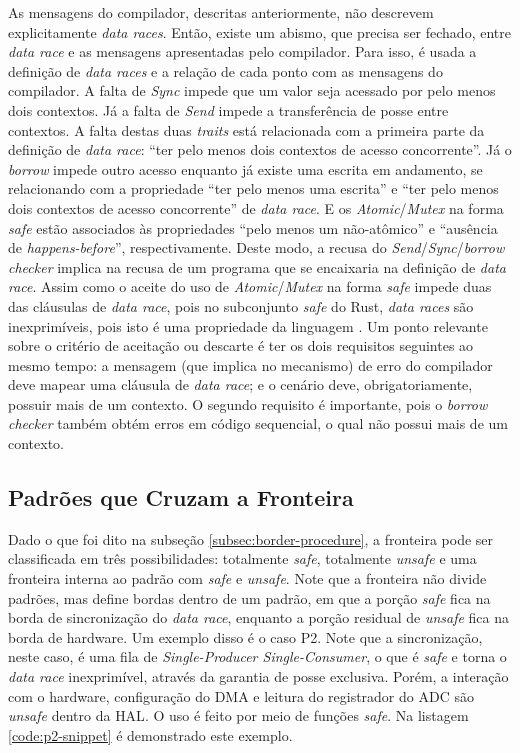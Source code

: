 As mensagens do compilador, descritas anteriormente, não descrevem explicitamente \textit{data races}. Então, existe um abismo, que precisa ser fechado, entre \textit{data race} e as mensagens apresentadas pelo compilador. Para isso, é usada a definição de \textit{data races} e a relação de cada ponto com as mensagens do compilador. A falta de \textit{Sync} impede que um valor seja acessado por pelo menos dois contextos. Já a falta de \textit{Send} impede a transferência de posse entre contextos. A falta destas duas \textit{traits} está relacionada com a primeira parte da definição de \textit{data race}: ``ter pelo menos dois contextos de acesso concorrente''. Já o \textit{borrow} impede outro acesso enquanto já existe uma escrita em andamento, se relacionando com a propriedade ``ter pelo menos uma escrita'' e ``ter pelo menos dois contextos de acesso concorrente'' de \textit{data race}. E os \textit{Atomic}/\textit{Mutex} na forma \textit{safe} estão associados às propriedades ``pelo menos um não-atômico'' e ``ausência de \textit{happens-before}'', respectivamente. Deste modo, a recusa do \textit{Send}/\textit{Sync}/\textit{borrow checker} implica na recusa de um programa que se encaixaria na definição de \textit{data race}. Assim como o aceite do uso de \textit{Atomic}/\textit{Mutex} na forma \textit{safe} impede duas das cláusulas de \textit{data race}, pois no subconjunto \textit{safe} do Rust, \textit{data races} são inexprimíveis, pois isto é uma propriedade da linguagem \citep{article:rust-safe-soundness}. Um ponto relevante sobre o critério de aceitação ou descarte é ter os dois requisitos seguintes ao mesmo tempo: a mensagem (que implica no mecanismo) de erro do compilador deve mapear uma cláusula de \textit{data race}; e o cenário deve, obrigatoriamente, possuir mais de um contexto. O segundo requisito é importante, pois o \textit{borrow checker} também obtém erros em código sequencial, o qual não possui mais de um contexto.

\subsection{Padrões que Cruzam a Fronteira}
\label{subsec:border-crossing}

Dado o que foi dito na subseção \ref{subsec:border-procedure}, a fronteira pode ser classificada em três possibilidades: totalmente \textit{safe}, totalmente \textit{unsafe} e uma fronteira interna ao padrão com \textit{safe} e \textit{unsafe}. Note que a fronteira não divide padrões, mas define bordas dentro de um padrão, em que a porção \textit{safe} fica na borda de sincronização do \textit{data race}, enquanto a porção residual de \textit{unsafe} fica na borda de hardware. Um exemplo disso é o caso P2. Note que a sincronização, neste caso, é uma fila de \textit{Single-Producer Single-Consumer}, o que é \textit{safe} e torna o \textit{data race} inexprimível, através da garantia de posse exclusiva. Porém, a interação com o hardware, configuração do \ac{DMA} e leitura do registrador do \ac{ADC} são \textit{unsafe} dentro da \ac{HAL}. O uso é feito por meio de funções \textit{safe}. Na listagem \ref{code:p2-snippet} é demonstrado este exemplo.

